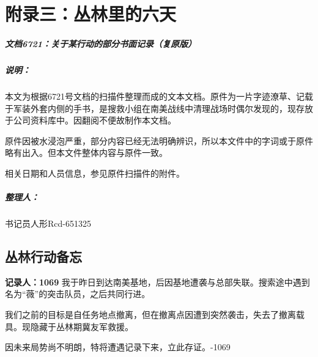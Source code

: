 \chapter{附录三：丛林里的六天}

\paragraph*{文档6721：关于某行动的部分书面记录（复原版）} \mbox{}

\lineseparator

\paragraph*{说明：}
本文为根据6721号文档的扫描件整理而成的文本文档。原件为一片字迹潦草、记载于军装外套内侧的手书，是搜救小组在南美战线中清理战场时偶尔发现的，现存放于公司资料库中。因翻阅不便故制作本文档。

原件因被水浸泡严重，部分内容已经无法明确辨识，所以本文件中的字词或于原件略有出入。但本文件整体内容与原件一致。

相关日期和人员信息，参见原件扫描件的附件。

\paragraph*{整理人：}书记员人形Rcd-651325

\lineseparator

\section*{丛林行动备忘}
\textbf{记录人：1069}
我于昨日到达南美基地，后因基地遭袭与总部失联。搜索途中遇到名为“薇”的突击队员，之后共同行进。

我们之前的目标是自任务地点撤离，但在撤离点因遭到突然袭击，失去了撤离载具。现隐藏于丛林期冀友军救援。

因未来局势尚不明朗，特将遭遇记录下来，立此存证。-1069

